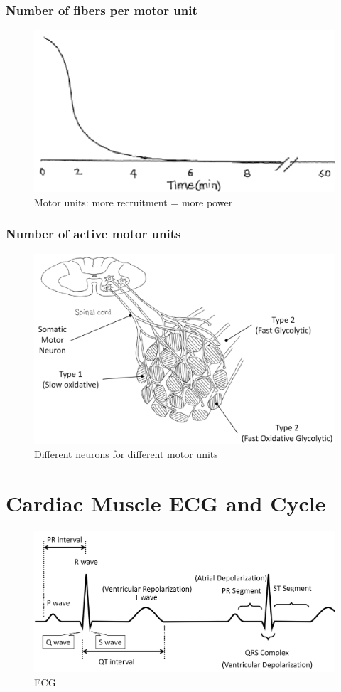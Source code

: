 \documentclass[11pt,fleqn]{book}
\begin{document}
\subsubsection{Number of fibers per motor unit}
\begin{figure}[h!]
\begin{center}
    \includegraphics[width=0.6\linewidth]{Pictures/Screenshot 2024-04-03 231449.png}
    \caption{Motor units: more recruitment = more power}
\end{center}
\end{figure}


\subsubsection{Number of active motor units}
\begin{figure}[h!]
\begin{center}
    \includegraphics[width=0.5\linewidth]{Pictures/Screenshot 2024-04-03 232435.png}
    \caption{Different neurons for different
motor units}
\end{center}
\end{figure}

\newpage
\section{Cardiac Muscle ECG and Cycle}
\begin{figure}[h!]
\begin{center}
    \includegraphics[width=0.8\linewidth]{Pictures/Screenshot 2024-04-03 234918.png}
    \caption{ECG}
\end{center}
\end{figure}
\end{document}
